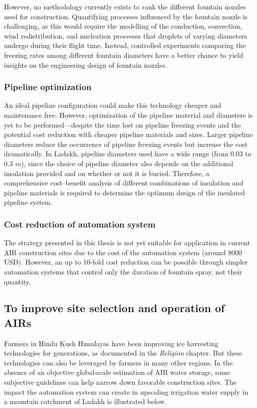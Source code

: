 However, no methodology currently exists to rank the different fountain nozzles used for construction. Quantifying
processes influenced by the fountain nozzle is challenging, as this would require the modelling of the conduction,
convection, wind redistribution, and nucleation processes that droplets of varying diameters undergo during
their flight time. Instead, controlled experiments comparing the freezing rates among different fountain
diameters have a better chance to yield insights on the engineering design of fountain nozzles.

\subsubsection{Pipeline optimization}

An ideal pipeline configuration could make this technology cheaper and maintenance free. However, optimization
of the pipeline material and diameters is yet to be performed---despite the time lost on pipeline freezing
events and the potential cost reduction with cheaper pipeline materials and sizes. Larger pipeline diameters
reduce the occurrence of pipeline freezing events but increase the cost dramatically. In Ladakh, pipeline
diameters used have a wide range (from 0.03 to 0.3 $m$), since the choice of pipeline diameter also depends on
the additional insulation provided and on whether or not it is buried. Therefore, a comprehensive cost--benefit
analysis of different combinations of insulation and pipeline materials is required to determine the optimum
design of the insulated pipeline system.

\subsubsection{Cost reduction of automation system}

The strategy presented in this thesis is not yet suitable for application in current \ac{AIR} construction sites due to the cost of the
automation system (around 8000 USD). However, an up to 10-fold cost reduction can be possible through
simpler automation systems that control only the duration of fountain spray, not their quantity. 

\subsection{To improve site selection and operation of \ac{AIRs} }

Farmers in Hindu Kush Himalayas have been improving ice harvesting technologies for generations, as documented in
the \textit{Religion} chapter. But these technologies can also be leveraged by farmers in many other regions. In
the absence of an objective global-scale estimation of \ac{AIR} water storage, some subjective guidelines
can help narrow down favorable construction sites. The impact the automation system
can create in upscaling irrigation water supply in a mountain catchment of Ladakh is illustrated below.


